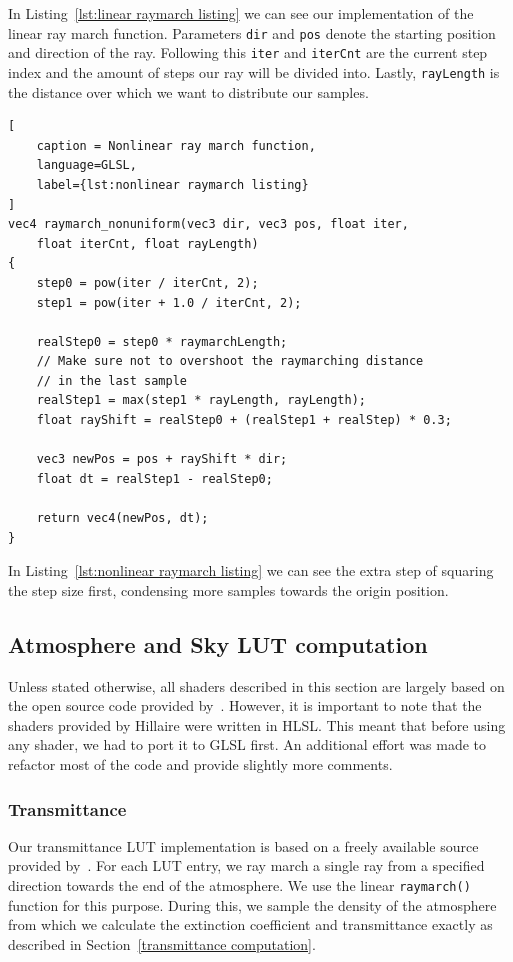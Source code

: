 \documentclass{ctuthesis}
\begin{document}
In Listing~\ref{lst:linear raymarch listing} we can see our implementation of the linear ray march
function. Parameters \verb|dir| and \verb|pos| denote the starting position and direction of the 
ray. Following this \verb|iter| and \verb|iterCnt| are the current step index and the amount of steps
our ray will be divided into. Lastly, \verb|rayLength| is the distance over which we want to 
distribute our samples. 

\begin{lstlisting}[
    caption = Nonlinear ray march function,
    language=GLSL,
    label={lst:nonlinear raymarch listing}
]
vec4 raymarch_nonuniform(vec3 dir, vec3 pos, float iter, 
    float iterCnt, float rayLength)
{
    step0 = pow(iter / iterCnt, 2);
    step1 = pow(iter + 1.0 / iterCnt, 2);

    realStep0 = step0 * raymarchLength;
    // Make sure not to overshoot the raymarching distance 
    // in the last sample
    realStep1 = max(step1 * rayLength, rayLength);
    float rayShift = realStep0 + (realStep1 + realStep) * 0.3;

    vec3 newPos = pos + rayShift * dir;
    float dt = realStep1 - realStep0;

    return vec4(newPos, dt);
}
\end{lstlisting}

In Listing~\ref{lst:nonlinear raymarch listing} we can see the extra step 
of squaring the step size first, condensing more samples towards the origin position.

\subsection{Atmosphere and Sky LUT computation}
Unless stated otherwise, all shaders described in this section are largely based on the open source
code provided by~\cite{hillaire_2020}. However, it is important to note that the shaders provided
by Hillaire were written in HLSL. This meant that before using any shader, we had to port
it to GLSL first. An additional effort was made to refactor most of the code and provide slightly more
comments. 

\subsubsection{Transmittance}
Our transmittance LUT implementation is based on a freely available source provided 
by~\cite{bruneton_neyret_2008}. For each LUT entry, we ray march a single ray from a 
specified direction towards the end of the atmosphere. We use the linear \verb|raymarch()|
function for this purpose. During this, we sample the density of the atmosphere from 
which we calculate the extinction coefficient and transmittance exactly as described
in Section~\ref{transmittance computation}.
\end{document}
